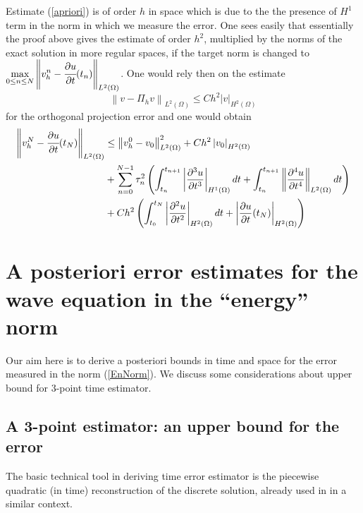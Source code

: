 \documentclass{imanum}
\begin{document}
\begin{remark} Estimate (\ref{apriori}) is of order $h$ in space which is due to the the presence of $H^1$ term in the norm in which we
measure the error. One sees easily that essentially the proof above gives the estimate of order $h^2$, multiplied by the norms of the exact solution in more regular spaces, if the target norm is changed to \newline $\displaystyle \max_{0 \leq n \leq N}\left\Vert v^n_h - \cfrac{\partial u}{\partial t} (t_n) \right\Vert_{L^2(\Omega)}$. One would rely then on the estimate
$$
 \left\| v - \Pi_h v \right\|_{L^2(\Omega)} \leq Ch^2 | v |_{H^2(\Omega)}
$$
for the orthogonal projection error and one would obtain
  \begin{align}\label{apriori2}
     \left\Vert v^N_h - \cfrac{\partial u}{\partial t} (t_N) \right\Vert_{L^2(\Omega)} & \leq \left\| v^0_h - v_0 \right\|_{L^2(\Omega)}^2
    +Ch^2\left| v_0 \right|_{H^2(\Omega)}\\
    \notag & + \sum_{n = 0}^{N - 1} \tau^2_n \left(
    \int_{t_n}^{t_{n + 1}} \left\vert \frac{\partial^3 u}{\partial t^3} \right\vert_{H^1(\Omega)} {dt} +
    \int_{t_n}^{t_{n + 1}} \left\Vert  \frac{\partial^4 u}{\partial t^4} \right\Vert_{L^2(\Omega)} {dt} \right)
    \\
    \notag & + C h^2  \left( \int_{t_0}^{t_N} \left\vert  \frac{\partial^2 u}{\partial t^2} \right\vert_{H^2(\Omega)} {dt}
    + \left\vert  \frac{\partial u}{\partial t}(t_N) \right\vert_{H^2(\Omega)}
    \right)
  \end{align}

\end{remark}



\section{A posteriori error estimates for the wave equation in the ``energy'' norm}\label{section3}
Our aim here is to derive a posteriori bounds in time and space for the error measured in the norm (\ref{EnNorm}). We discuss some considerations about upper bound for $3$-point time estimator.


\subsection{A 3-point estimator: an upper bound for the error}


The basic technical tool in deriving time error estimator is the piecewise quadratic (in time) reconstruction of the discrete solution, already used in \cite{LPP} in a similar context.  
\end{document}
